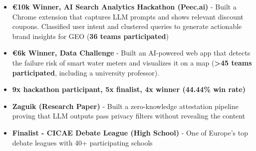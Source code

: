 \documentclass[a4paper,11pt]{article}
\newenvironment{cvitemize}
  {\begin{itemize}}
  {\end{itemize}\vspace{0.8em}} %
\begin{document}
\begin{cvitemize}

\item \textbf{€10k Winner, AI Search Analytics Hackathon (Peec.ai)} - Built a Chrome extension that captures LLM prompts and shows relevant discount coupons. Classified user intent and clustered queries to generate actionable brand insights for GEO (\textbf{36 teams participated})
\vspace{0.5em} %

\item \noindent \textbf{€6k Winner, Data Challenge} - Built an AI-powered web app that detects the failure risk of smart water meters and visualizes it on a map (\textbf{>45 teams participated}, including a university professor).
\vspace{0.3em} %


\item \noindent \textbf{9x hackathon participant, 5x finalist, 4x winner (44.44\% win rate)}
\vspace{0.5em} %


\item \noindent \textbf{Zaguik (Research Paper)} - Built a zero-knowledge attestation pipeline proving that LLM outputs pass privacy filters without revealing the content
\vspace{0.5em} %

\item \noindent \textbf{Finalist - CICAE Debate League (High School)} - One of Europe's top debate leagues with 40+ participating schools
\vspace{0.5em} %


\end{cvitemize}
\end{document}
